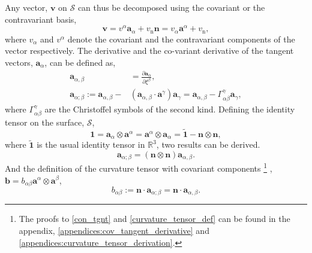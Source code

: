 \documentclass[../main.tex]{subfiles}
\begin{document}
Any vector, $\boldsymbol{v}$ on $\mathcal{S}$ can thus be decomposed using the covariant or the contravariant basis,
\begin{equation}
    \boldsymbol{v} = v^{\alpha} \boldsymbol{a}_{\alpha} + v_{\mathrm{n}}\boldsymbol{n} = v_{\alpha} \boldsymbol{a}^{\alpha} + v_{\mathrm{n}},
\end{equation}
 where $v_{\alpha}$ and $v^{\alpha}$ denote the covariant and the contravariant components of the vector respectively.
The derivative and the co-variant derivative of the tangent vectors, $\boldsymbol{a}_{\alpha}$, can be defined as,
\begin{align}\label{tangent_derivatives}
    \boldsymbol{a}_{\alpha , \beta} &= \frac{\partial \boldsymbol{a}_{\alpha}}{\partial \xi^{\beta}},\\
    \boldsymbol{a}_{\alpha ; \beta} := \boldsymbol{a}_{\alpha , \beta} - &(\boldsymbol{a}_{\alpha , \beta} \cdot \boldsymbol{a}^{\gamma}) \boldsymbol{a}_{\gamma} = \boldsymbol{a}_{\alpha , \beta} - \Gamma^{\gamma}_{\alpha \beta} \boldsymbol{a}_{\gamma},
\end{align}
where $\Gamma^{\gamma}_{\alpha \beta}$ are the Christoffel symbols of the second kind.
Defining the identity tensor on the surface, $\mathcal{S}$,
\begin{equation}\label{surface_identity}
    \boldsymbol{1} = \boldsymbol{a}_{\alpha} \otimes \boldsymbol{a}^{\alpha} = \boldsymbol{a}^{\alpha} \otimes \boldsymbol{a}_{\alpha} = \boldsymbol{\tilde{1}} - \boldsymbol{n} \otimes \boldsymbol{n}, 
\end{equation}
where $\boldsymbol{\tilde{1}}$ is the usual identity tensor in $\mathbb{R}^{3}$, two results can be derived.
\begin{equation}\label{con_tgnt}
    \boldsymbol{a}_{\alpha ; \beta} = (\boldsymbol{n} \otimes \boldsymbol{n}) \boldsymbol{a}_{\alpha,\beta}.
\end{equation}
And the definition of the curvature tensor with covariant components \footnote{The proofs to \eqref{con_tgnt} and \eqref{curvature_tensor_def} can be found in the appendix, \eqref{appendices:cov_tangent_derivative} and \eqref{appendices:curvature_tensor_derivation}.}
 , $\boldsymbol{b} = b_{\alpha \beta} \boldsymbol{a}^{\alpha}
 \otimes \boldsymbol{a}^{\beta}$,
\begin{equation} \label{curvature_tensor_def}
    b_{\alpha \beta} := \boldsymbol{n} \cdot \boldsymbol{a}_{\alpha ; \beta} = \boldsymbol{n} \cdot \boldsymbol{a}_{\alpha,\beta}.
\end{equation}
\end{document}

